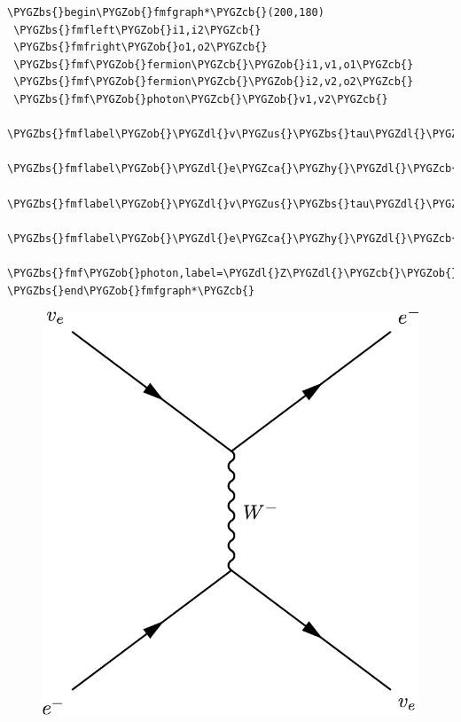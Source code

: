 \documentclass[letterpaper,12pt,english]{sphinxmanual}
\def\PYGZbs{\char`\\}
\def\PYGZus{\char`\_}
\def\PYGZob{\char`\{}
\def\PYGZcb{\char`\}}
\def\PYGZca{\char`\^}
\def\PYGZdl{\char`\$}
\def\PYGZhy{\char`\-}
\begin{document}
\begin{Verbatim}[commandchars=\\\{\}]
\PYGZbs{}begin\PYGZob{}fmfgraph*\PYGZcb{}(200,180)
 \PYGZbs{}fmfleft\PYGZob{}i1,i2\PYGZcb{}
 \PYGZbs{}fmfright\PYGZob{}o1,o2\PYGZcb{}
 \PYGZbs{}fmf\PYGZob{}fermion\PYGZcb{}\PYGZob{}i1,v1,o1\PYGZcb{}
 \PYGZbs{}fmf\PYGZob{}fermion\PYGZcb{}\PYGZob{}i2,v2,o2\PYGZcb{}
 \PYGZbs{}fmf\PYGZob{}photon\PYGZcb{}\PYGZob{}v1,v2\PYGZcb{}
 \PYGZbs{}fmflabel\PYGZob{}\PYGZdl{}v\PYGZus{}\PYGZbs{}tau\PYGZdl{}\PYGZcb{}\PYGZob{}i2\PYGZcb{}
 \PYGZbs{}fmflabel\PYGZob{}\PYGZdl{}e\PYGZca{}\PYGZhy{}\PYGZdl{}\PYGZcb{}\PYGZob{}i1\PYGZcb{}
 \PYGZbs{}fmflabel\PYGZob{}\PYGZdl{}v\PYGZus{}\PYGZbs{}tau\PYGZdl{}\PYGZcb{}\PYGZob{}o2\PYGZcb{}
 \PYGZbs{}fmflabel\PYGZob{}\PYGZdl{}e\PYGZca{}\PYGZhy{}\PYGZdl{}\PYGZcb{}\PYGZob{}o1\PYGZcb{}
 \PYGZbs{}fmf\PYGZob{}photon,label=\PYGZdl{}Z\PYGZdl{}\PYGZcb{}\PYGZob{}v1,v2\PYGZcb{}
\PYGZbs{}end\PYGZob{}fmfgraph*\PYGZcb{}
\end{Verbatim}
\begin{figure}[htbp]
\centering

\includegraphics{nueCharged.png}
\end{figure}
\end{document}
